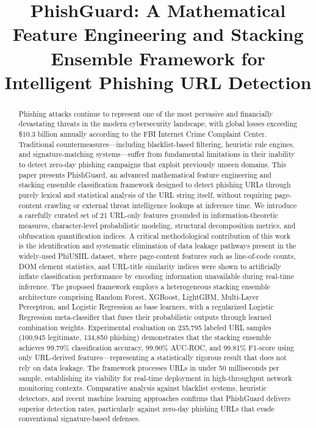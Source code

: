 \documentclass[conference]{IEEEtran}
\begin{document}
\title{PhishGuard: A Mathematical Feature Engineering and Stacking Ensemble Framework for Intelligent Phishing URL Detection\\
}

\author{
}

\maketitle

\begin{abstract}
Phishing attacks continue to represent one of the most pervasive and financially devastating threats in the modern cybersecurity landscape, with global losses exceeding \$10.3 billion annually according to the FBI Internet Crime Complaint Center. Traditional countermeasures---including blacklist-based filtering, heuristic rule engines, and signature-matching systems---suffer from fundamental limitations in their inability to detect zero-day phishing campaigns that exploit previously unseen domains. This paper presents PhishGuard, an advanced mathematical feature engineering and stacking ensemble classification framework designed to detect phishing URLs through purely lexical and statistical analysis of the URL string itself, without requiring page-content crawling or external threat intelligence lookups at inference time. We introduce a carefully curated set of 21 URL-only features grounded in information-theoretic measures, character-level probabilistic modeling, structural decomposition metrics, and obfuscation quantification indices. A critical methodological contribution of this work is the identification and systematic elimination of data leakage pathways present in the widely-used PhiUSIIL dataset, where page-content features such as line-of-code counts, DOM element statistics, and URL-title similarity indices were shown to artificially inflate classification performance by encoding information unavailable during real-time inference. The proposed framework employs a heterogeneous stacking ensemble architecture comprising Random Forest, XGBoost, LightGBM, Multi-Layer Perceptron, and Logistic Regression as base learners, with a regularized Logistic Regression meta-classifier that fuses their probabilistic outputs through learned combination weights. Experimental evaluation on 235,795 labeled URL samples (100,945 legitimate, 134,850 phishing) demonstrates that the stacking ensemble achieves 99.79\% classification accuracy, 99.90\% AUC-ROC, and 99.81\% F1-score using only URL-derived features---representing a statistically rigorous result that does not rely on data leakage. The framework processes URLs in under 50 milliseconds per sample, establishing its viability for real-time deployment in high-throughput network monitoring contexts. Comparative analysis against blacklist systems, heuristic detectors, and recent machine learning approaches confirms that PhishGuard delivers superior detection rates, particularly against zero-day phishing URLs that evade conventional signature-based defenses.
\end{abstract}
\end{document}
